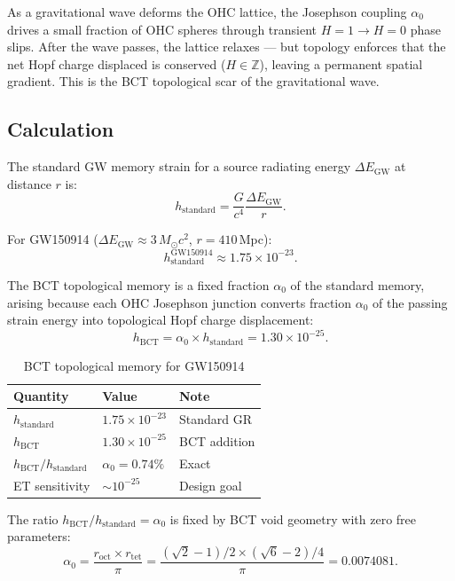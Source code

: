\documentclass[aps,prl,twocolumn,superscriptaddress,showpacs]{revtex4-2}
\begin{document}
As a gravitational wave deforms the OHC lattice, the Josephson 
coupling $\alpha_0$ drives a small fraction of OHC spheres 
through transient $H=1 \to H=0$ phase slips. After the wave 
passes, the lattice relaxes — but topology enforces that the 
net Hopf charge displaced is conserved ($H\in\mathbb{Z}$), 
leaving a permanent spatial gradient. This is the BCT topological 
scar of the gravitational wave.

\subsection{Calculation}

The standard GW memory strain for a source radiating energy 
$\Delta E_\mathrm{GW}$ at distance $r$ is:
\begin{equation}
h_\mathrm{standard} = \frac{G}{c^4}\frac{\Delta E_\mathrm{GW}}{r}.
\end{equation}

For GW150914 ($\Delta E_\mathrm{GW} \approx 3\,M_\odot c^2$, 
$r = 410$\,Mpc):
\begin{equation}
h_\mathrm{standard}^\mathrm{GW150914} \approx 1.75\times10^{-23}.
\end{equation}

The BCT topological memory is a fixed fraction $\alpha_0$ 
of the standard memory, arising because each OHC Josephson 
junction converts fraction $\alpha_0$ of the passing strain 
energy into topological Hopf charge displacement:
\begin{equation}
\boxed{h_\mathrm{BCT} = \alpha_0 \times h_\mathrm{standard} 
= 1.30\times10^{-25}.}
\end{equation}

\begin{table}[h]
\centering
\caption{BCT topological memory for GW150914}
\begin{tabular}{lll}
\hline\hline
Quantity & Value & Note \\
\hline
$h_\mathrm{standard}$ & $1.75\times10^{-23}$ & Standard GR \\
$h_\mathrm{BCT}$ & $1.30\times10^{-25}$ & BCT addition \\
$h_\mathrm{BCT}/h_\mathrm{standard}$ & $\alpha_0 = 0.74\%$ & Exact \\
ET sensitivity & $\sim10^{-25}$ & Design goal \\
\hline\hline
\end{tabular}
\end{table}

The ratio $h_\mathrm{BCT}/h_\mathrm{standard} = \alpha_0$ is 
fixed by BCT void geometry with zero free parameters:
\begin{equation}
\alpha_0 = \frac{r_\mathrm{oct}\times r_\mathrm{tet}}{\pi} 
= \frac{(\sqrt{2}-1)/2 \times (\sqrt{6}-2)/4}{\pi} = 0.0074081.
\end{equation}
\end{document}

